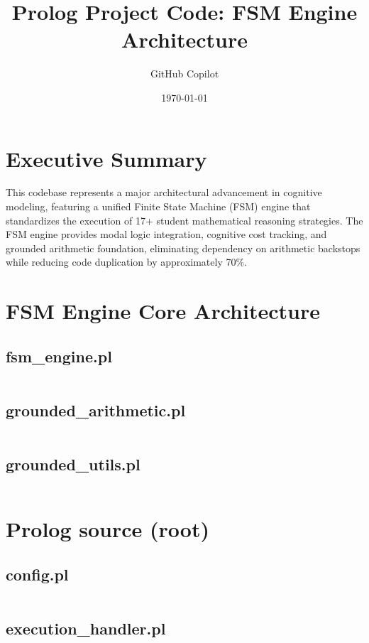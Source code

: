 \documentclass{article}
\title{Prolog Project Code: FSM Engine Architecture}
\author{GitHub Copilot}
\date{\today}
\begin{document}
\maketitle

\section*{Executive Summary}
This codebase represents a major architectural advancement in cognitive modeling, featuring a unified Finite State Machine (FSM) engine that standardizes the execution of 17+ student mathematical reasoning strategies. The FSM engine provides modal logic integration, cognitive cost tracking, and grounded arithmetic foundation, eliminating dependency on arithmetic backstops while reducing code duplication by approximately 70\%.

\tableofcontents
\newpage

\section{FSM Engine Core Architecture}
\subsection{fsm\_engine.pl}
\inputminted{prolog}{fsm_engine.pl}
\subsection{grounded\_arithmetic.pl}
\inputminted{prolog}{grounded_arithmetic.pl}
\subsection{grounded\_utils.pl}
\inputminted{prolog}{grounded_utils.pl}

\section{Prolog source (root)}
\subsection{config.pl}
\inputminted{prolog}{config.pl}
\subsection{execution\_handler.pl}
\inputminted{prolog}{execution_handler.pl}
\end{document}
